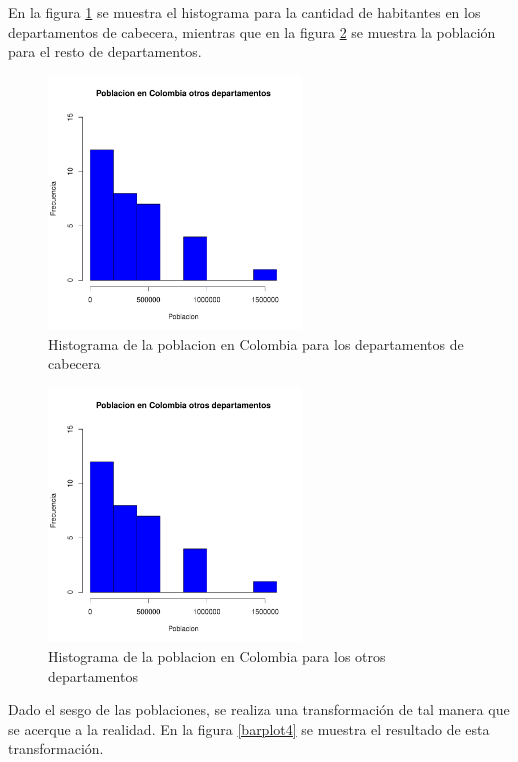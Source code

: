 En la figura \ref{barplot2} se muestra el histograma para la cantidad de habitantes en los departamentos de cabecera, mientras que en la figura \ref{barplot3} se muestra la poblaci\'on para el resto de departamentos.
 
\begin{figure}[H]
\centering
\includegraphics[width=0.6\textwidth]{univariada-summaryDatos}
\caption{Histograma de la poblacion en Colombia para los departamentos de cabecera}
\label{barplot2}

\end{figure}
\begin{figure}[H]
\centering
\includegraphics[width=0.6\textwidth]{univariada-summaryDatos}
\caption{Histograma de la poblacion en Colombia para los otros departamentos}
\label{barplot3}
\end{figure}

Dado el sesgo de las poblaciones, se realiza una transformaci\'on de tal manera que se acerque a la realidad. En la figura \ref{barplot4} se muestra el resultado de esta transformaci\'on.

